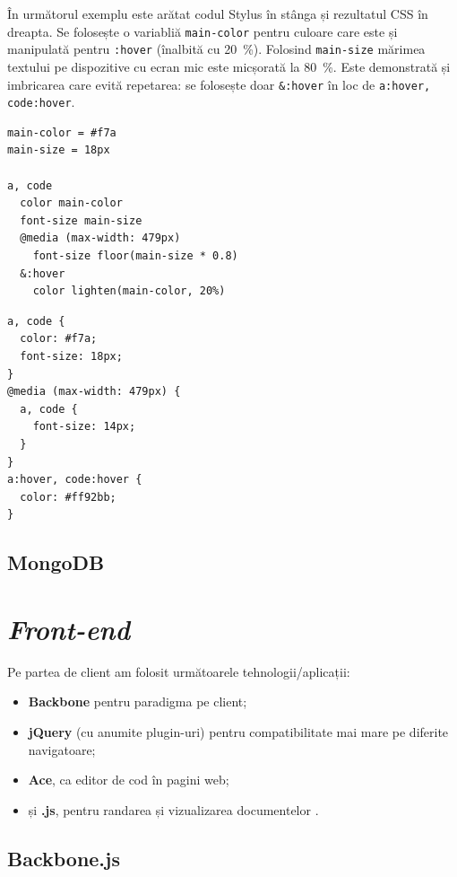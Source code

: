 \documentclass[a4wide,12pt]{report}
\newcommand{\eng}[1]{\emph{#1}} %
\newcommand{\cod}[1]{\texttt{#1}}
\newcommand{\acr}[1]{{\textsmaller[1]{\textsc{#1}}}} %
\begin{document}
În următorul exemplu este arătat codul Stylus în stânga și rezultatul CSS în
dreapta. Se folosește o variabliă \cod{main-color} pentru culoare care este și
manipulată pentru \cod{:hover} (înalbită cu 20~\%). Folosind \cod{main-size}
mărimea textului pe dispozitive cu ecran mic este micșorată la 80~\%. Este
demonstrată și imbricarea care evită repetarea: se folosește doar \cod{\&:hover}
în loc de \cod{a:hover, code:hover}.

\minipage{9cm}
\begin{verbatim}
main-color = #f7a
main-size = 18px

a, code
  color main-color
  font-size main-size
  @media (max-width: 479px)
    font-size floor(main-size * 0.8)
  &:hover
    color lighten(main-color, 20%)
\end{verbatim}
\endminipage
\minipage{4cm}
\begin{verbatim}
a, code {
  color: #f7a;
  font-size: 18px;
}
@media (max-width: 479px) {
  a, code {
    font-size: 14px;
  }
}
a:hover, code:hover {
  color: #ff92bb;
}
\end{verbatim}
\endminipage

\subsection{MongoDB}

\section{\eng{Front-end}}

Pe partea de client am folosit următoarele tehnologii/aplicații:

\begin{itemize}

\item \textbf{Backbone} pentru paradigma \acr{MVC} pe client;

\item \textbf{jQuery} (cu anumite plugin-uri) pentru compatibilitate mai mare pe
diferite navigatoare;

\item \textbf{Ace}, ca editor de cod în pagini web;

\item și \textbf{\acr{PDF}.js}, pentru randarea și vizualizarea documentelor
\acr{PDF}.

\end{itemize}

\subsection{Backbone.js}
\end{document}
